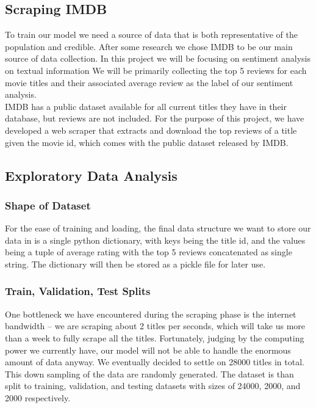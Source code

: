 \documentclass[11pt]{article}
\newcommand{\np}{\newpage}
\begin{document}
\subsection{Scraping IMDB}
To train our model we need a source of data that is both representative of the population and credible.  After some research we chose IMDB to be our main source of data collection.  In this project we will be focusing on sentiment analysis on textual information We will be primarily collecting the top 5 reviews for each movie titles and their associated average review as the label of our sentiment analysis.
\\[2mm]
IMDB has a public dataset available for all current titles they have in their database, but reviews are not included.  For the purpose of this project, we have developed a web scraper that extracts and download the top reviews of a title given the movie id, which comes with the public dataset released by IMDB.


\subsection{Exploratory Data Analysis}
\subsubsection{Shape of Dataset}
For the ease of training and loading, the final data structure we want to store our data in is a single python dictionary, with keys being the title id, and the values being a tuple of average rating with the top 5 reviews concatenated as single string.  The dictionary will then be stored as a pickle file for later use.

\subsubsection{Train, Validation, Test Splits}
One bottleneck we have encountered during the scraping phase is the internet bandwidth -- we are scraping about 2 titles per seconds, which will take us more than a week to fully scrape all the titles.  Fortunately, judging by the computing power we currently have, our model will not be able to handle the enormous amount of data anyway.  We eventually decided to settle on  28000 titles in total.  This down sampling of the data are randomly generated.  The dataset is than split to training, validation, and testing datasets with sizes of 24000, 2000, and 2000 respectively.
\np
\end{document}
